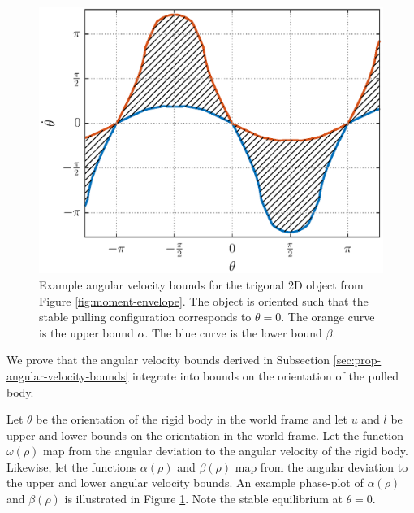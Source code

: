 \documentclass[conference]{IEEEtran}
\begin{document}
\begin{figure}[t]
  \centering
    \includegraphics[width=1\linewidth]{fig/omega_bounds_1}
    \caption{Example angular velocity bounds for the trigonal 2D object from Figure \ref{fig:moment-envelope}. The object is oriented such that the stable pulling configuration corresponds to $\theta=0$. The orange curve is the upper bound $\alpha$. The blue curve is the lower bound $\beta$.}
  \label{fig:omega-bounds}
\end{figure}

We prove that the angular velocity bounds derived in Subsection
\ref{sec:prop-angular-velocity-bounds} integrate into bounds on the
orientation of the pulled body.

Let $\theta$ be the orientation of the rigid body in the world frame
and let $u$ and $l$ be upper and lower bounds on the orientation in
the world frame. Let the function $\omega(\rho)$ map from the angular
deviation to the angular velocity of the rigid body. Likewise, let the
functions $\alpha(\rho)$ and $\beta(\rho)$ map from the angular
deviation to the upper and lower angular velocity bounds.  An example
phase-plot of $\alpha(\rho)$ and $\beta(\rho)$ is illustrated in
Figure \ref{fig:omega-bounds}. Note the stable equilibrium at
$\theta = 0$.

\end{document}
